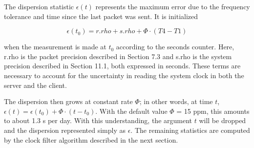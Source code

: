The dispersion statistic $ \epsilon(t) $ represents the maximum error due
to the frequency tolerance and time since the last packet was sent.
It is initialized

$$
\epsilon(t_0) = r.rho + s.rho + \Phi \cdot (T4 - T1)
$$

when the measurement is made at $ t_0 $ according to the seconds counter.
Here, r.rho is the packet precision described in Section 7.3 and
s.rho is the system precision described in Section 11.1, both
expressed in seconds. These terms are necessary to account for the
uncertainty in reading the system clock in both the server and the
client.

The dispersion then grows at constant rate $ \Phi $; in other words, at
time $ t $, $ \epsilon(t) = \epsilon(t_0) + \Phi \cdot (t - t_0) $. With the default
value $ \Phi $ = 15 ppm, this amounts to about 1.3 s per day. With this
understanding, the argument $ t $ will be dropped and the dispersion
represented simply as $ \epsilon $. The remaining statistics are computed
by the clock filter algorithm described in the next section.
